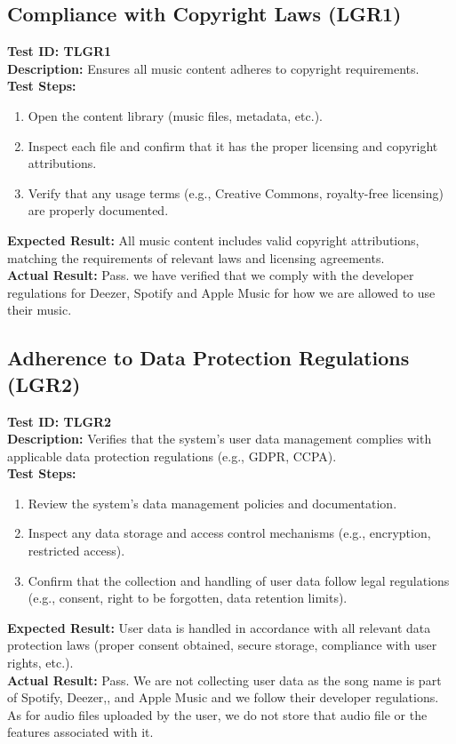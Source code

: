\documentclass[12pt, titlepage]{article}
\begin{document}
\subsection{Compliance with Copyright Laws (LGR1)}
\textbf{Test ID: TLGR1}\\
\textbf{Description:} Ensures all music content adheres to copyright requirements.\\
\textbf{Test Steps:}
\begin{enumerate}
    \item Open the content library (music files, metadata, etc.).
    \item Inspect each file and confirm that it has the proper licensing and copyright attributions.
    \item Verify that any usage terms (e.g., Creative Commons, royalty-free licensing) are properly documented.
\end{enumerate}
\textbf{Expected Result:} All music content includes valid copyright attributions, matching the requirements of relevant laws and licensing agreements.\\
\textbf{Actual Result:} Pass. we have verified that we comply with the developer regulations for Deezer, Spotify and Apple Music for how we are allowed to use their music.

\subsection{Adherence to Data Protection Regulations (LGR2)}
\textbf{Test ID: TLGR2}\\
\textbf{Description:} Verifies that the system's user data management complies with applicable data protection regulations (e.g., GDPR, CCPA).\\
\textbf{Test Steps:}
\begin{enumerate}
    \item Review the system's data management policies and documentation.
    \item Inspect any data storage and access control mechanisms (e.g., encryption, restricted access).
    \item Confirm that the collection and handling of user data follow legal regulations (e.g., consent, right to be forgotten, data retention limits).
\end{enumerate}
\textbf{Expected Result:} User data is handled in accordance with all relevant data protection laws (proper consent obtained, secure storage, compliance with user rights, etc.).\\
\textbf{Actual Result:} Pass. We are not collecting user data as the song name is part of Spotify, Deezer,, and Apple Music and we follow their developer regulations. As for audio files uploaded by the user, we do not store that audio file or the features associated with it.
	
\end{document}
